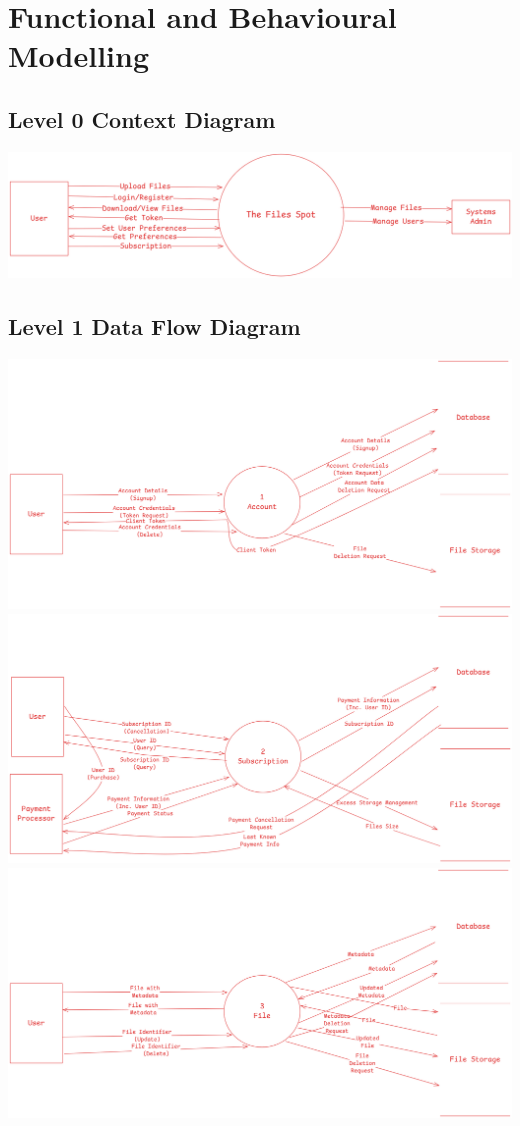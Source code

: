 \documentclass[12pt,a4paper]{report}
\begin{document}
\section{Functional and Behavioural Modelling}\label{sec:functional_and_behavioural_modelling}
\subsection{Level 0 Context Diagram}
\includegraphics[width=\textwidth]{dfd-L0.png}
\subsection{Level 1 Data Flow Diagram}
\includegraphics[width=\textwidth]{dfd-L1-user.png}
\includegraphics[width=\textwidth]{dfd-L1-subscription.png}
\includegraphics[width=\textwidth]{dfd-L1-file.png}
\end{document}
